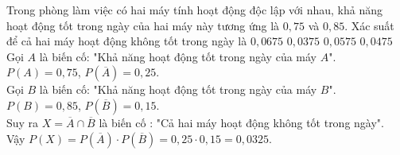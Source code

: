\begin{ex} %
	Trong phòng làm việc có hai máy tính hoạt động độc lập với nhau, khả năng hoạt động tốt trong ngày của hai máy này tương ứng là $0,75$ và $0,85$. Xác suất để cả hai máy hoạt động không tốt trong ngày là
	\choice
	{ $0,0675$ }
	{ \True $0,0375$ }
	{$0,0575$}
	{ $0,0475$}
	\loigiai
	{
		Gọi $A$ là biến cố: "Khả năng hoạt động tốt trong ngày của máy $A$".\\
		$P(A)=0,75$, $P( \overline{A} )=0,25$.\\
		Gọi $B$ là biến cố: "Khả năng hoạt động tốt trong ngày của máy $B$".\\
		$P( B )=0,85$, $P( \overline{B})=0,15$.\\
		Suy ra $X=\overline{A}\cap \overline{B}$ là biến cố : "Cả hai máy hoạt động không tốt trong ngày".\\
		Vậy $P(X)=P(\overline{A})\cdot P( \overline{B})=0,25\cdot  0,15 =0,0325$.
	}
\end{ex} 

